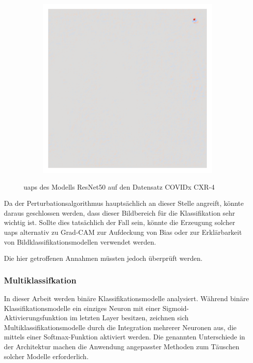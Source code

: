 \begin{figure}[H]
\begin{subfigure}{0.19\linewidth}
    \end{subfigure}\hfill%
    \begin{subfigure}{0.19\linewidth}
        \centering
        \includegraphics[height=1\linewidth]{01-images/05-resultate/uap_resnet50/uap4-resnet50-covidx_data-n200-robustificationslevel0.png}
    \end{subfigure}\hfill%
    \caption{\acrlong{uap}s des Modells ResNet50 auf den Datensatz COVIDx CXR-4}
    \label{fig:bias-detektion}
\end{figure}

Da der Perturbationsalgorithmus hauptsächlich an dieser Stelle angreift, könnte daraus geschlossen werden, dass dieser Bildbereich für die Klassifikation sehr wichtig ist. Sollte dies tatsächlich der Fall sein, könnte die Erzeugung solcher \acrshort{uap}s alternativ zu Grad-CAM zur Aufdeckung von Bias oder zur Erklärbarkeit von Bildklassifikationsmodellen verwendet werden. 

Die hier getroffenen Annahmen müssten jedoch überprüft werden.

\subsubsection{Multiklassifkation} \label{chap:multiklassifikation}
In dieser Arbeit werden binäre Klassifikationsmodelle analysiert. Während binäre Klassifikationsmodelle ein einziges Neuron mit einer Sigmoid-Aktivierungsfunktion im letzten Layer besitzen, zeichnen sich Multiklassifikationsmodelle durch die Integration mehrerer Neuronen aus, die mittels einer Softmax-Funktion aktiviert werden. Die genannten Unterschiede in der Architektur machen die Anwendung angepasster Methoden zum Täuschen solcher Modelle erforderlich.

